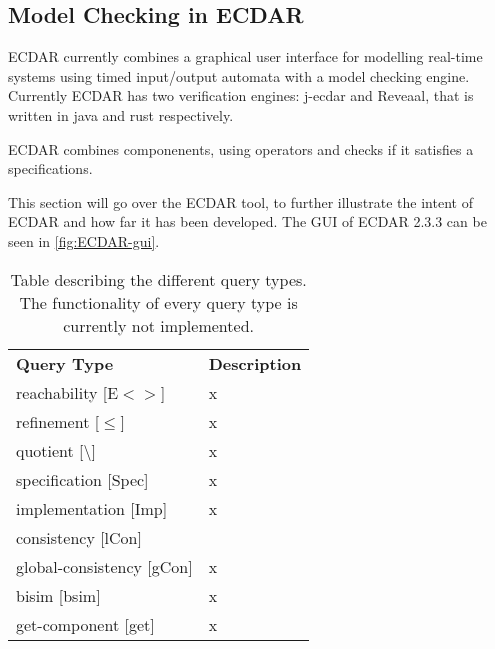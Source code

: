 \subsection{Model Checking in ECDAR}
ECDAR currently combines a graphical user interface for modelling real-time systems using timed input/output automata with a model checking engine. Currently ECDAR has two verification engines: j-ecdar and Reveaal, that is written in java and rust respectively.

ECDAR combines componenents, using operators and checks if it satisfies a specifications.




This section will go over the ECDAR tool, to further illustrate the intent of ECDAR and how far it has been developed. The GUI of ECDAR 2.3.3 can be seen in \autoref{fig:ECDAR-gui}.

\begin{table}[H]
\begin{tabular}{ll}
\textbf{Query Type} & \textbf{Description} \\
reachability [E$<>$]     & x                    \\
refinement [$\leq$]      & x                    \\
quotient [\textbackslash]& x                    \\
specification [Spec]     & x                    \\
implementation [Imp]     & x                    \\
consistency [lCon]       &                    \\
global-consistency [gCon]& x                    \\
bisim [bsim]             & x                    \\
get-component [get]      & x                    \\
\end{tabular}
\caption{\label{tab:querytypes}Table describing the different query types. The functionality of every query type is currently not implemented.}
\end{table}